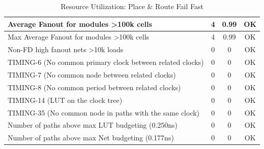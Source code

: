 \documentclass{article}
\begin{document}
\begin{table}[H]
{\begin{tabular}{|l|c|c|c|}
    Average Fanout for modules \textgreater 100k cells               & 4                  & 0.99                 & OK              \\ \hline
    Max Average Fanout for modules \textgreater 100k cells           & 4                  & 0.99                 & OK              \\ \hline
    Non-FD high fanout nets \textgreater 10k loads                   & 0                  & 0                    & OK              \\ \hline
    TIMING-6 (No common primary clock between related clocks)         & 0                  & 0                    & OK              \\ \hline
    TIMING-7 (No common node between related clocks)                  & 0                  & 0                    & OK              \\ \hline
    TIMING-8 (No common period between related clocks)                & 0                  & 0                    & OK              \\ \hline
    TIMING-14 (LUT on the clock tree)                                 & 0                  & 0                    & OK              \\ \hline
    TIMING-35 (No common node in paths with the same clock)           & 0                  & 0                    & OK              \\ \hline
    Number of paths above max LUT budgeting (0.250ns)                 & 0                  & 0                    & OK              \\ \hline
    Number of paths above max Net budgeting (0.177ns)                 & 0                  & 0                    & OK              \\ \hline
    \end{tabular}
    }
    \caption{Resource Utilization: Place \& Route Fail Fast}
\end{table}
\end{document}
